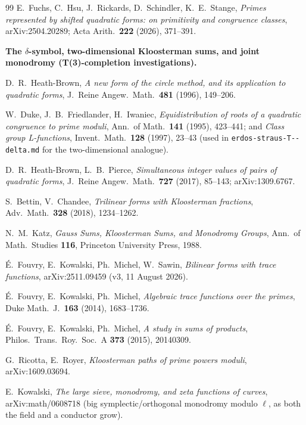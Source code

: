 \documentclass[11pt]{article}
\theoremstyle{plain}
\theoremstyle{definition}
\theoremstyle{remark}
\renewcommand{\_}{\textunderscore\allowbreak}
\begin{document}
\begin{thebibliography}{99}
 E.~Fuchs, C.~Hsu, J.~Rickards, D.~Schindler, K.~E.~Stange, \emph{Primes
represented by shifted quadratic forms: on primitivity and congruence classes},
arXiv:2504.20289; Acta Arith.\ \textbf{222} (2026), 371--391.

\bigskip\noindent\textbf{The $\delta$-symbol, two-dimensional Kloosterman sums, and joint
monodromy (T(3)-completion investigations).}

 D.~R.~Heath-Brown, \emph{A new form of the circle method, and its
application to quadratic forms}, J.\ Reine Angew.\ Math.\ \textbf{481} (1996), 149--206.

 W.~Duke, J.~B.~Friedlander, H.~Iwaniec, \emph{Equidistribution of roots of a
quadratic congruence to prime moduli}, Ann.\ of Math.\ \textbf{141} (1995), 423--441; and
\emph{Class group L-functions}, Invent.\ Math.\ \textbf{128} (1997), 23--43 (used in
\texttt{erdos-\allowbreak straus-\allowbreak T--\allowbreak delta.md} for the two-dimensional analogue).

 D.~R.~Heath-Brown, L.~B.~Pierce, \emph{Simultaneous integer values
of pairs of quadratic forms}, J.\ Reine Angew.\ Math.\ \textbf{727} (2017), 85--143;
arXiv:1309.6767.

 S.~Bettin, V.~Chandee, \emph{Trilinear forms with Kloosterman
fractions}, Adv.\ Math.\ \textbf{328} (2018), 1234--1262.

 N.~M.~Katz, \emph{Gauss Sums, Kloosterman Sums, and Monodromy Groups}, Ann.\
of Math.\ Studies \textbf{116}, Princeton University Press, 1988.

 \'E.~Fouvry, E.~Kowalski, Ph.~Michel, W.~Sawin, \emph{Bilinear forms with
trace functions}, arXiv:2511.09459 (v3, 11 August 2026).

 \'E.~Fouvry, E.~Kowalski, Ph.~Michel, \emph{Algebraic trace
functions over the primes}, Duke Math.\ J.\ \textbf{163} (2014), 1683--1736.

 \'E.~Fouvry, E.~Kowalski, Ph.~Michel, \emph{A study in sums
of products}, Philos.\ Trans.\ Roy.\ Soc.\ A \textbf{373} (2015), 20140309.

 G.~Ricotta, E.~Royer, \emph{Kloosterman paths of prime powers
moduli}, arXiv:1609.03694.

 E.~Kowalski, \emph{The large sieve, monodromy, and zeta functions of
curves}, arXiv:math/0608718 (big symplectic/orthogonal monodromy modulo $\ell$, as both the
field and a conductor grow).


\end{thebibliography}
\end{document}
